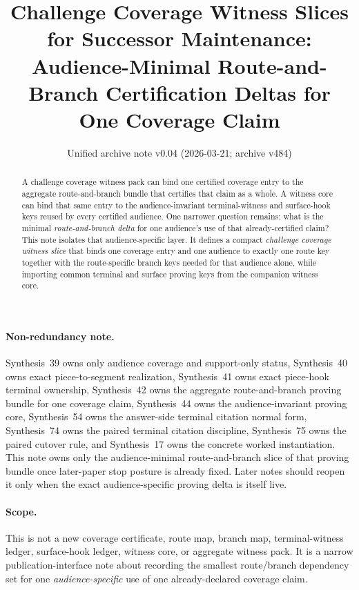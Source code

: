 \documentclass[11pt]{article}
\title{Challenge Coverage Witness Slices for Successor Maintenance:\\[0.5ex]
\large Audience-Minimal Route-and-Branch Certification Deltas for One Coverage Claim}
\author{}
\date{Unified archive note v0.04 (2026-03-21; archive v484)}
\begin{document}
\maketitle

\begin{abstract}
A challenge coverage witness pack can bind one certified coverage entry to the aggregate route-and-branch bundle that certifies that claim as a whole.
A witness core can bind that same entry to the audience-invariant terminal-witness and surface-hook keys reused by every certified audience.
One narrower question remains: what is the minimal \emph{route-and-branch delta} for one audience's use of that already-certified claim?
This note isolates that audience-specific layer.
It defines a compact \emph{challenge coverage witness slice} that binds one coverage entry and one audience to exactly one route key together with the route-specific branch keys needed for that audience alone, while importing common terminal and surface proving keys from the companion witness core.
\end{abstract}

\paragraph{Non-redundancy note.}
Synthesis~39 owns only audience coverage and support-only status, Synthesis~40 owns exact piece-to-segment realization, Synthesis~41 owns exact piece-hook terminal ownership, Synthesis~42 owns the aggregate route-and-branch proving bundle for one coverage claim, Synthesis~44 owns the audience-invariant proving core, Synthesis~54 owns the answer-side terminal citation normal form, Synthesis~74 owns the paired terminal citation discipline, Synthesis~75 owns the paired cutover rule, and Synthesis~17 owns the concrete worked instantiation.
This note owns only the audience-minimal route-and-branch slice of that proving bundle once later-paper stop posture is already fixed. Later notes should reopen it only when the exact audience-specific proving delta is itself live.
\paragraph{Scope.}
This is not a new coverage certificate, route map, branch map, terminal-witness ledger, surface-hook ledger, witness core, or aggregate witness pack.
It is a narrow publication-interface note about recording the smallest route/branch dependency set for one \emph{audience-specific} use of one already-declared coverage claim.
\end{document}
